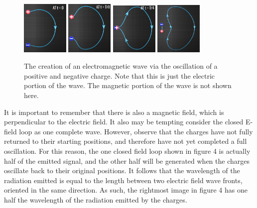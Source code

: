 \documentclass[12pt]{article}
\begin{document}
\begin{figure}[h]
    \centering
    \includegraphics[width=0.20\textwidth]{dipole-at-t0.png} 
    \includegraphics[width=0.20\textwidth]{dipole-at-t1.png}
    \includegraphics[width=0.20\textwidth]{dipole-at-t2.png}
    \includegraphics[width=0.20\textwidth]{dipole-at-t3.png}
    \caption{The creation of an electromagnetic wave via the oscillation of a positive and negative charge. Note that this is just the electric portion of the wave. The magnetic portion of the wave is not shown here.}
\end{figure}

It is important to remember that there is also a magnetic field, which is perpendicular to the electric field. It also may be tempting consider the closed E-field loop as one complete wave. However, observe that the charges have not fully returned to their starting positions, and therefore have not yet completed a full oscillation. For this reason, the one closed field loop shown in figure 4 is actually half of the emitted signal, and the other half will be generated when the charges oscillate back to their original positions. It follows that the wavelength of the radiation emitted is equal to the length between two electric field wave fronts, oriented in the same direction. As such, the rightmost image in figure 4 has one half the wavelength of the radiation emitted by the charges.
\end{document}
